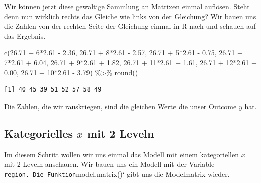 \documentclass[
  letterpaper,
]{scrbook}
\newenvironment{Shaded}{\begin{snugshade}}{\end{snugshade}}
\newcommand{\DecValTok}[1]{\textcolor[rgb]{0.68,0.00,0.00}{#1}}
\newcommand{\FloatTok}[1]{\textcolor[rgb]{0.68,0.00,0.00}{#1}}
\newcommand{\FunctionTok}[1]{\textcolor[rgb]{0.28,0.35,0.67}{#1}}
\newcommand{\NormalTok}[1]{\textcolor[rgb]{0.00,0.23,0.31}{#1}}
\newcommand{\SpecialCharTok}[1]{\textcolor[rgb]{0.37,0.37,0.37}{#1}}
\begin{document}
Wir können jetzt diese gewaltige Sammlung an Matrixen einmal auflösen.
Steht denn nun wirklich rechts das Gleiche wie links von der Gleichung?
Wir bauen uns die Zahlen von der rechten Seite der Gleichung einmal in R
nach und schauen auf das Ergebnis.

\begin{Shaded}
\begin{Highlighting}[]
\FunctionTok{c}\NormalTok{(}\FloatTok{26.71} \SpecialCharTok{+}  \DecValTok{6}\SpecialCharTok{*}\FloatTok{2.61} \SpecialCharTok{{-}} \FloatTok{2.36}\NormalTok{,}
  \FloatTok{26.71} \SpecialCharTok{+}  \DecValTok{8}\SpecialCharTok{*}\FloatTok{2.61} \SpecialCharTok{{-}} \FloatTok{2.57}\NormalTok{,}
  \FloatTok{26.71} \SpecialCharTok{+}  \DecValTok{5}\SpecialCharTok{*}\FloatTok{2.61} \SpecialCharTok{{-}} \FloatTok{0.75}\NormalTok{,}
  \FloatTok{26.71} \SpecialCharTok{+}  \DecValTok{7}\SpecialCharTok{*}\FloatTok{2.61} \SpecialCharTok{+} \FloatTok{6.04}\NormalTok{,}
  \FloatTok{26.71} \SpecialCharTok{+}  \DecValTok{9}\SpecialCharTok{*}\FloatTok{2.61} \SpecialCharTok{+} \FloatTok{1.82}\NormalTok{,}
  \FloatTok{26.71} \SpecialCharTok{+} \DecValTok{11}\SpecialCharTok{*}\FloatTok{2.61} \SpecialCharTok{+} \FloatTok{1.61}\NormalTok{,}
  \FloatTok{26.71} \SpecialCharTok{+} \DecValTok{12}\SpecialCharTok{*}\FloatTok{2.61} \SpecialCharTok{+} \FloatTok{0.00}\NormalTok{,}
  \FloatTok{26.71} \SpecialCharTok{+} \DecValTok{10}\SpecialCharTok{*}\FloatTok{2.61} \SpecialCharTok{{-}} \FloatTok{3.79}\NormalTok{) }\SpecialCharTok{\%\textgreater{}\%} \FunctionTok{round}\NormalTok{() }
\end{Highlighting}
\end{Shaded}

\begin{verbatim}
[1] 40 45 39 51 52 57 58 49
\end{verbatim}

Die Zahlen, die wir rauskriegen, sind die gleichen Werte die unser
Outcome \(y\) hat.

\hypertarget{kategorielles-x-mit-2-leveln}{%
\subsection{\texorpdfstring{Kategorielles \(x\) mit 2
Leveln}{Kategorielles x mit 2 Leveln}}\label{kategorielles-x-mit-2-leveln}}

Im diesem Schritt wollen wir uns einmal das Modell mit einem
kategoriellen \(x\) mit 2 Leveln anschauen. Wir bauen uns ein Modell mit
der Variable
\texttt{region\textasciigrave{}\textasciigrave{}.\ Die\ Funktion}model.matrix()`
gibt uns die Modelmatrix wieder.
\end{document}

